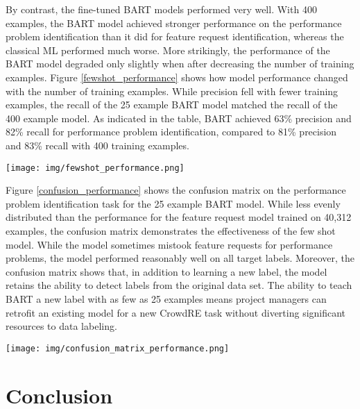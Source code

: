 By contrast, the fine-tuned BART models performed very well. With 400 examples, the BART model achieved stronger performance on the performance problem identification than it did for feature request identification, whereas the classical ML performed much worse. More strikingly, the performance of the BART model degraded only slightly when after decreasing the number of training examples. Figure \ref{fewshot_performance} shows how model performance changed with the number of training examples. While precision fell with fewer training examples, the recall of the 25 example BART model matched the recall of the 400 example model. As indicated in the table, BART achieved 63\% precision and 82\% recall for performance problem identification, compared to 81\% precision and 83\% recall with 400 training examples.

\begin{figure*}
  \texttt{[image: img/fewshot\_performance.png]}
\caption{Few-shot model performance for the performance problem identification task.}
\label{fewshot_performance}
\end{figure*}

Figure \ref{confusion_performance} shows the confusion matrix on the performance problem identification task for the 25 example BART model. While less evenly distributed than the performance for the feature request model trained on 40,312 examples, the confusion matrix demonstrates the effectiveness of the few shot model. While the model sometimes mistook feature requests for performance problems, the model performed reasonably well on all target labels. Moreover, the confusion matrix shows that, in addition to learning a new label, the model retains the ability to detect labels from the original data set. The ability to teach BART a new label with as few as 25 examples means project managers can retrofit an existing model for a new CrowdRE task without diverting significant resources to data labeling.

\begin{figure*}
  \texttt{[image: img/confusion\_matrix\_performance.png]}
\caption{BART confusion matrix for performance problem identification with 25 training examples.}
\label{confusion_performance}
\end{figure*}

\section{Conclusion}

